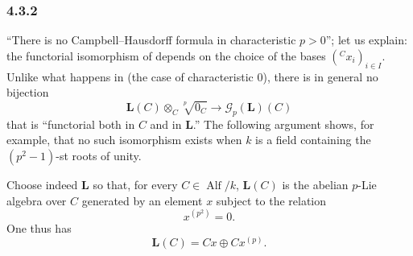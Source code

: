 
\subsubsection*{4.3.2}
\label{sga3:VIIB:4.3.2}

``There is no Campbell--Hausdorff formula in characteristic
\(p>0\)''; let us explain: the functorial isomorphism of
 depends on the choice of the bases
\(({}^C x_i)_{i\in I}\). Unlike what happens in 
\textup{(the case of characteristic \(0\))}, there is in general no
bijection
\[
  \mathbf L(C)\otimes_C\sqrt[p]{0_C}
  \longrightarrow
  \mathscr G_p(\mathbf L)(C)
\]
that is ``functorial both in \(C\) and in \(\mathbf L\).''
The following argument shows, for example, that no such
isomorphism exists when \(k\) is a field containing the
\((p^2-1)\)-st roots of unity.

Choose indeed \(\mathbf L\) so that, for every
\(C\in\operatorname{Alf}/k\), \(\mathbf L(C)\) is the
abelian \(p\)-Lie algebra over \(C\) generated by an element \(x\)
subject to the relation
\[
  x^{(p^2)}=0.
\]
One thus has
\[
  \mathbf L(C)
  =
  Cx\oplus Cx^{(p)}.
\]

